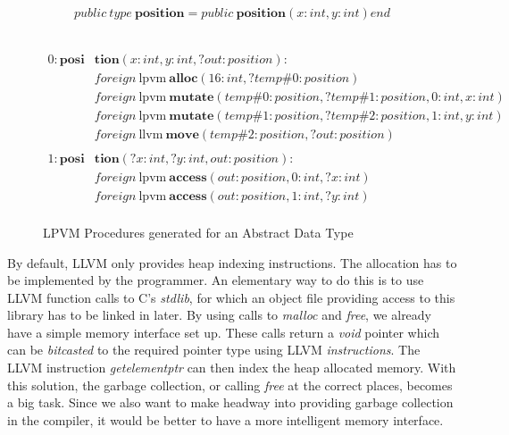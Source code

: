 \begin{figure}
  \begin{minipage}{\textwidth}
    \begin{equation*}
      public\ type\ \mathbf{position} = public\ \mathbf{position}(x:int, y:int) end
    \end{equation*}\\
  \end{minipage}
  \begin{minipage}{\textwidth}
    \begin{align*}
      0: \mathbf{posi}&\mathbf{tion}(x:int, y:int, ?out:position): \\
          & foreign\ \mathrm{lpvm}\ \mathbf{alloc}(16:int, ?temp\#0:position) \\
          & foreign\ \mathrm{lpvm}\ \mathbf{mutate}(temp\#0:position, ?temp\#1:position,
            0:int, x:int) \\
          & foreign\ \mathrm{lpvm}\ \mathbf{mutate}(temp\#1:position, ?temp\#2:position,
            1:int, y:int) \\
          & foreign\ \mathrm{llvm}\ \mathbf{move}(temp\#2:position,
            ?out:position) \\ \\
      1: \mathbf{posi}&\mathbf{tion}(?x:int, ?y:int, out:position): \\
                      & foreign\ \mathrm{lpvm}\ \mathbf{access}(out:position,
                        0:int, ?x:int) \\
                      & foreign\ \mathrm{lpvm}\ \mathbf{access}(out:position,
                        1:int, ?y:int) \\
    \end{align*}
  \end{minipage}
  
  \label{fig:procs_adt}
  \caption{LPVM Procedures generated for an Abstract Data Type}  
\end{figure}

By default, LLVM only provides heap indexing instructions. The allocation has
to be implemented by the programmer. An elementary way to do this is to use
LLVM function calls to C's \textit{stdlib}, for which an object file providing
access to this library has to be linked in later. By using calls to
\textit{malloc} and \textit{free}, we already have a simple memory interface
set up. These calls return a \textit{void} pointer which can be
\textit{bitcasted} to the required pointer type using LLVM
\textit{instructions}. The LLVM instruction \textit{getelementptr} can then
index the heap allocated memory. With this solution, the garbage collection, or
calling \textit{free} at the correct places, becomes a big task. Since we also
want to make headway into providing garbage collection in the compiler, it
would be better to have a more intelligent memory interface.

